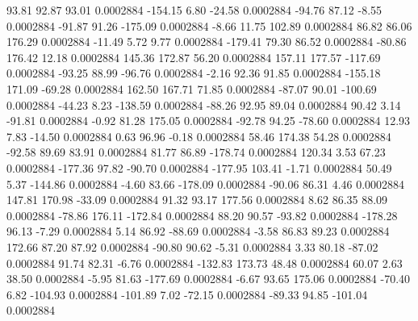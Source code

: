        93.81       92.87       93.01     0.0002884
     -154.15        6.80      -24.58     0.0002884
      -94.76       87.12       -8.55     0.0002884
      -91.87       91.26     -175.09     0.0002884
       -8.66       11.75      102.89     0.0002884
       86.82       86.06      176.29     0.0002884
      -11.49        5.72        9.77     0.0002884
     -179.41       79.30       86.52     0.0002884
      -80.86      176.42       12.18     0.0002884
      145.36      172.87       56.20     0.0002884
      157.11      177.57     -117.69     0.0002884
      -93.25       88.99      -96.76     0.0002884
       -2.16       92.36       91.85     0.0002884
     -155.18      171.09      -69.28     0.0002884
      162.50      167.71       71.85     0.0002884
      -87.07       90.01     -100.69     0.0002884
      -44.23        8.23     -138.59     0.0002884
      -88.26       92.95       89.04     0.0002884
       90.42        3.14      -91.81     0.0002884
       -0.92       81.28      175.05     0.0002884
      -92.78       94.25      -78.60     0.0002884
       12.93        7.83      -14.50     0.0002884
        0.63       96.96       -0.18     0.0002884
       58.46      174.38       54.28     0.0002884
      -92.58       89.69       83.91     0.0002884
       81.77       86.89     -178.74     0.0002884
      120.34        3.53       67.23     0.0002884
     -177.36       97.82      -90.70     0.0002884
     -177.95      103.41       -1.71     0.0002884
       50.49        5.37     -144.86     0.0002884
       -4.60       83.66     -178.09     0.0002884
      -90.06       86.31        4.46     0.0002884
      147.81      170.98      -33.09     0.0002884
       91.32       93.17      177.56     0.0002884
        8.62       86.35       88.09     0.0002884
      -78.86      176.11     -172.84     0.0002884
       88.20       90.57      -93.82     0.0002884
     -178.28       96.13       -7.29     0.0002884
        5.14       86.92      -88.69     0.0002884
       -3.58       86.83       89.23     0.0002884
      172.66       87.20       87.92     0.0002884
      -90.80       90.62       -5.31     0.0002884
        3.33       80.18      -87.02     0.0002884
       91.74       82.31       -6.76     0.0002884
     -132.83      173.73       48.48     0.0002884
       60.07        2.63       38.50     0.0002884
       -5.95       81.63     -177.69     0.0002884
       -6.67       93.65      175.06     0.0002884
      -70.40        6.82     -104.93     0.0002884
     -101.89        7.02      -72.15     0.0002884
      -89.33       94.85     -101.04     0.0002884
